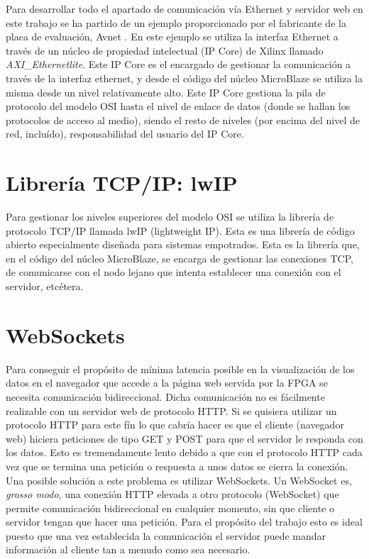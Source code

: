 \documentclass[conference,compsoc]{IEEEtran}
\begin{document}
	Para desarrollar todo el apartado de comunicaci\'on v\'ia Ethernet y servidor web en este
	trabajo se ha partido de un ejemplo proporcionado por el fabricante de la placa de evaluaci\'on,
	Avnet \cite{bib:lwip-example}. En este ejemplo se utiliza la interfaz Ethernet a trav\'es de un
	n\'ucleo de propiedad intelectual (IP Core) de Xilinx llamado \emph{AXI\_Ethernetlite}. Este IP
	Core es el encargado de gestionar la comunicaci\'on a trav\'es de la interfaz ethernet, y desde
	el c\'odigo del n\'ucleo MicroBlaze se utiliza la misma desde un nivel relativamente alto. Este
	IP Core gestiona la pila de protocolo del modelo OSI hasta el nivel de enlace de datos (donde se
	hallan los protocolos de acceso al medio), siendo el resto de niveles (por encima del nivel de
	red, inclu\'ido), responsabilidad del usuario del IP Core.

\section{Librer\'ia TCP/IP: lwIP}

	Para gestionar los niveles superiores del modelo OSI se utiliza la librer\'ia de protocolo
	TCP/IP llamada lwIP (lightweight IP). Esta es una librer\'ia de c\'odigo abierto especialmente
	dise\~nada para sistemas empotrados. Esta es la librer\'ia que, en el c\'odigo del n\'ucleo
	MicroBlaze, se encarga de gestionar las conexiones TCP, de comunicarse con el nodo lejano que
	intenta establecer una conexi\'on con el servidor, etc\'etera.

\section{WebSockets}

	Para conseguir el prop\'osito de m\'inima latencia posible en la visualizaci\'on de los datos en
	el navegador que accede a la p\'agina web servida por la FPGA se necesita comunicaci\'on
	bidireccional. Dicha comunicaci\'on no es f\'acilmente realizable con un servidor web de
	protocolo HTTP. Si se quisiera utilizar un protocolo HTTP para este f\'in lo que cabr\'ia hacer
	es que el cliente (navegador web) hiciera peticiones de tipo GET y POST para que el servidor le
	responda con los datos. Esto es tremendamente lento debido a que con el protocolo HTTP cada vez
	que se termina una petici\'on o respuesta a unos datos se cierra la conexi\'on. Una posible
	soluci\'on a este problema es utilizar WebSockets. Un WebSocket es, \emph{grosso modo}, una
	conexi\'on HTTP elevada a otro protocolo (WebSocket) que permite comunicaci\'on bidireccional en
	cualquier momento, sin que cliente o servidor tengan que hacer una petici\'on. Para el
	prop\'osito del trabajo esto es ideal puesto que una vez establecida la comunicaci\'on el
	servidor puede mandar informaci\'on al cliente tan a menudo como sea necesario.
\end{document}
